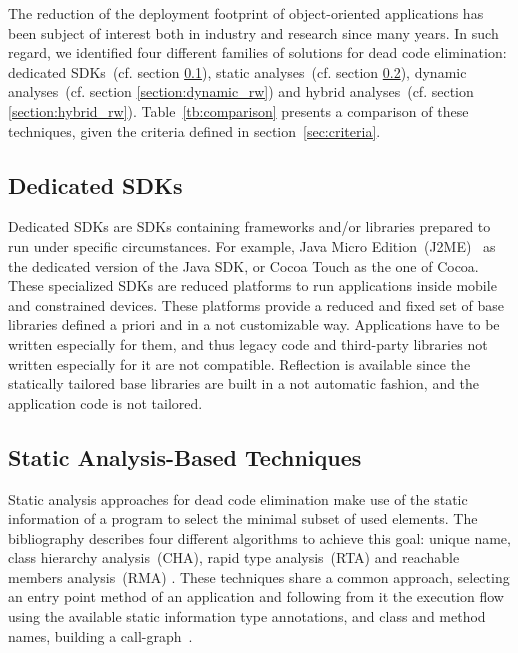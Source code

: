 The reduction of the deployment footprint of object-oriented applications has been subject of interest both in industry and research since many years. In such regard, we identified four different families of solutions for dead code elimination: dedicated SDKs~(cf. section \ref{section:static_selection_rw}), static analyses~(cf. section \ref{section:static_rw}), dynamic analyses~(cf. section \ref{section:dynamic_rw}) and hybrid analyses~(cf. section \ref{section:hybrid_rw}). Table~\ref{tb:comparison} presents a comparison of these techniques, given the criteria defined in section~\ref{sec:criteria}.

\subsection{Dedicated SDKs}%
\label{section:static_selection_rw}

Dedicated SDKs are SDKs containing frameworks and/or libraries prepared to run under specific circumstances. For example, Java Micro Edition~(J2ME)~\cite{JavaME} as the dedicated version of the Java SDK, or Cocoa Touch as the one of Cocoa. These specialized SDKs are reduced platforms to run applications inside mobile and constrained devices. These platforms provide a reduced and fixed set of base libraries defined a priori and in a not customizable way. Applications have to be written especially for them, and thus legacy code and third-party libraries not written especially for it are not compatible. Reflection is available since the statically tailored base libraries are built in a not automatic fashion, and the application code is not tailored.

\subsection{Static Analysis-Based Techniques}\label{section:static_rw}

Static analysis approaches for dead code elimination make use of the static information of a program to select the minimal subset of used elements. The bibliography describes four different algorithms to achieve this goal: unique name, class hierarchy analysis~(CHA), rapid type analysis~(RTA) and reachable members analysis~(RMA) \cite{Baco96a, Titz06a}. These techniques share a common approach, selecting an entry point method of an application and following from it the execution flow using the available static information \ie type annotations, and class and method names, building a call-graph~\cite{ShortGrov97a}.

